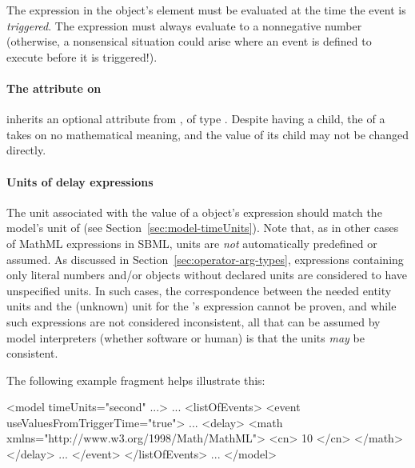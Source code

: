 The expression in the \Delay object's  element must be
evaluated at the time the event is \emph{triggered}.  The expression
must always evaluate to a nonnegative number (otherwise, a
nonsensical situation could arise where an event is defined to
execute before it is triggered!).


\begin{blockChanged}
\paragraph{The  attribute on }
\label{sec:delay-id}

\Delay inherits an optional  attribute from \SBase, of type .  Despite having a  child, the  of a \Delay takes on no mathematical meaning, and the value of its  child may not be changed directly.
\end{blockChanged}


\paragraph{Units of delay expressions}

The unit associated with the value of a \Delay object's
 expression should match the model's unit of
 (see Section~\ref{sec:model-timeUnits}).  Note
that, as in other cases of MathML expressions in SBML, units are
\emph{not} automatically predefined or assumed.  As discussed in
Section~\ref{sec:operator-arg-types}, expressions containing only
literal numbers and/or \Parameter objects without declared units
are considered to have unspecified units.  In such cases, the
correspondence between the needed entity units and the (unknown)
unit for the \Delay's  expression cannot be proven,
and while such expressions are not considered inconsistent, all
that can be assumed by model interpreters (whether software or
human) is that the units \emph{may} be consistent.

The following \Event example fragment helps illustrate this:
\label{sec:event:delay:example}

\vspace*{0.5ex}
\begin{example}
<model timeUnits="second" ...>
    ...
    <listOfEvents>
        <event useValuesFromTriggerTime="true">
            ...
            <delay>
                <math xmlns="http://www.w3.org/1998/Math/MathML">
                    <cn> 10 </cn>
                </math>
            </delay>
            ...
        </event>
    </listOfEvents>
    ...
</model>
\end{example}
\vspace*{0.5ex}

